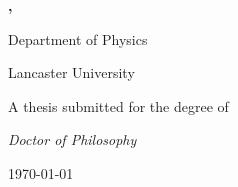 

\begin{titlepage}

\center

\vspace{1cm} %

\huge  \textbf{\thesistitle}

\vspace{2cm}

\Large \textbf{\authorname, \authordegrees}

Department of Physics

Lancaster University

\vfill

\large

A thesis submitted for the degree of

\textit{Doctor of Philosophy}

\vspace{0.5cm}

\monthyeardate\today

\end{titlepage}
